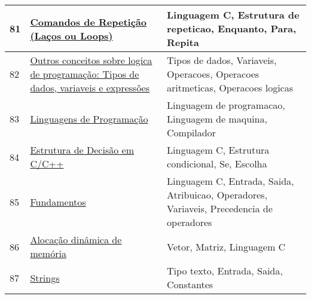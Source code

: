 \begin{longtable}{| p{} | p{} | p{} |}
81  & \href{https://sites.google.com/site/itabits/treinamento/introducao-a-programacao-em-c/comandos-de-repeticao}{\color{blue} Comandos de Repetição (Laços ou Loops)                                              } & Linguagem C, Estrutura de repeticao, Enquanto, Para, Repita                                                                                       \\ \hline
82  & \href{https://www.dca.ufrn.br/~ivan/DCA0800/tiposDados.pdf}{\color{blue} Outros conceitos sobre logica de programação: Tipos de dados, variaveis e expressões} & Tipos de dados, Variaveis, Operacoes, Operacoes aritmeticas, Operacoes logicas                                                                    \\ \hline
83  & \href{https://www.dcc.fc.up.pt/~nam/aulas/9900/ic/slides/sliic9918/}{\color{blue} Linguagens de Programação                                                           } & Linguagem de programacao, Linguagem de maquina, Compilador                                                                                        \\ \hline
84  & \href{https://www.devmedia.com.br/estrutura-de-decisao-em-c-c/24031}{\color{blue} Estrutura de Decisão em C/C++                                                       } & Linguagem C, Estrutura condicional, Se, Escolha                                                                                                   \\ \hline
85  & \href{https://www.ime.usp.br/~hitoshi/introducao/03-Fundamentos.pdf}{\color{blue} Fundamentos                                                                         } & Linguagem C, Entrada, Saida, Atribuicao, Operadores, Variaveis, Precedencia de operadores                                                         \\ \hline
86  & \href{https://www.ime.usp.br/~pf/algoritmos/aulas/aloca.html}{\color{blue} Alocação dinâmica de memória                                                        } & Vetor, Matriz, Linguagem C                                                                                                                        \\ \hline
87  & \href{https://www.ime.usp.br/~pf/algoritmos/aulas/string.html}{\color{blue} Strings                                                                             } & Tipo texto, Entrada, Saida, Constantes                                                                                                            \\ \hline

\end{longtable}
